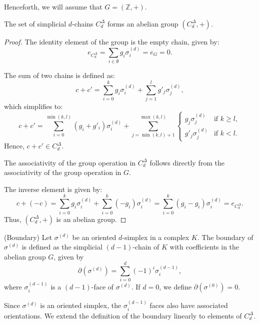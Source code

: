 Henceforth, we will assume that $G = (\mathbb{Z}, +)$.

\begin{lemma}
	The set of simplicial $d$-chains $C^{\Delta}_{d}$ forms an abelian group $(C^{\Delta}
	_{d}, +)$.
\end{lemma}

\begin{proof}
	The identity element of the group is the empty chain, given by:
	\[
		e_{C^{\Delta}_d}= \sum_{i \in \emptyset}g_{i} \sigma_{i}^{(d)}= e_{G} = 0.
	\]

	The sum of two chains is defined as:
	\[
		c + c' = \sum_{i=0}^{k}g_{i} \sigma_{i}^{(d)}+ \sum_{j=1}^{l}g'_{j} \sigma_{j}
		^{(d)},
	\]
	which simplifies to:
	\[
		c + c' = \sum_{i=0}^{\min(k, l)}(g_{i} + g'_{i}) \sigma_{i}^{(d)}+ \sum_{j=\min(k,
		l)+1}^{\max(k, l)}
		\begin{cases}
			g_{j} \sigma_{j}^{(d)}  & \text{if }k \geq l, \\
			g'_{j} \sigma_{j}^{(d)} & \text{if }k < l.
		\end{cases}
	\]
	Hence, $c + c' \in C^{\Delta}_{d}$.

	The associativity of the group operation in $C^{\Delta}_{d}$ follows directly from
	the associativity of the group operation in $G$.

	The inverse element is given by:
	\[
		c + (-c) = \sum_{i=0}^{k}g_{i} \sigma_{i}^{(d)}+ \sum_{i=0}^{k}(-g_{i}) \sigma
		_{i}^{(d)}= \sum_{i=0}^{k}(g_{i} - g_{i}) \sigma_{i}^{(d)}= e_{C^{\Delta}_d}.
	\]
	Thus, $(C^{\Delta}_{d}, +)$ is an abelian group.
\end{proof}

\begin{definition}
	{(Boundary) \cite[p.106]{hatcher2005algebraic}} Let $\sigma^{(d)}$ be an oriented
	$d$-simplex in a complex $K$. The boundary of $\sigma^{(d)}$ is defined as the
	simplicial $(d-1)$-chain of $K$ with coefficients in the abelian group $G$, given
	by
	\begin{equation}
		\partial(\sigma^{(d)}) = \sum_{i=0}^{d}(-1)^{i} \sigma^{(d-1)}_{i},
	\end{equation}
	where $\sigma^{(d-1)}_{i}$ is a $(d-1)$-face of $\sigma^{(d)}$. If $d = 0$, we
	define $\partial(\sigma^{(0)}) = 0$.
\end{definition}

Since $\sigma^{(d)}$ is an oriented simplex, the $\sigma^{(d-1)}_{i}$ faces also
have associated orientations. We extend the definition of the boundary linearly to
elements of $C^{\Delta}_{d}$.

